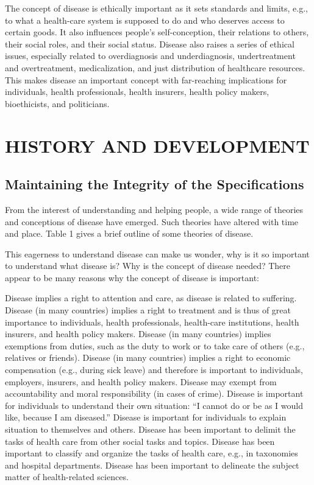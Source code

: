 \documentclass[conference]{IEEEtran}
\begin{document}
The concept of disease is ethically important as it sets standards and limits, e.g., to what a health-care system is supposed to do and who deserves access to certain goods. It also inﬂuences people’s self-conception, their relations to others, their social roles, and their social status. Disease also raises a series of ethical issues, especially related to overdiagnosis and underdiagnosis, undertreatment and overtreatment, medicalization, and just distribution of healthcare resources. This makes disease an important concept with far-reaching implications for individuals, health professionals, health insurers, health policy makers, bioethicists, and politicians.
\section{HISTORY AND DEVELOPMENT}

\subsection{Maintaining the Integrity of the Specifications}
\cite{b1}
From the interest of understanding and helping people, a wide range of theories and conceptions of disease have emerged. Such theories have altered with time and place. Table 1 gives a brief outline of some theories of disease.

This eagerness to understand disease can make us wonder, why is it so important to understand what disease is? Why is the concept of disease needed? There appear to be many reasons why the concept of disease is important:

Disease implies a right to attention and care, as disease is related to suffering.
Disease (in many countries) implies a right to treatment and is thus of great importance to individuals, health professionals, health-care institutions, health insurers, and health policy makers.
Disease (in many countries) implies exemptions from duties, such as the duty to work or to take care of others (e.g., relatives or friends).
Disease (in many countries) implies a right to economic compensation (e.g., during sick leave) and therefore is important to individuals, employers, insurers, and health policy makers.
Disease may exempt from accountability and moral responsibility (in cases of crime).
Disease is important for individuals to understand their own situation: “I cannot do or be as I would like, because I am diseased.”
Disease is important for individuals to explain  situation to themselves and others.
Disease has been important to delimit the tasks of health care from other social tasks and topics.
Disease has been important to classify and organize the tasks of health care, e.g., in taxonomies and hospital departments.
Disease has been important to delineate the subject matter of health-related sciences.
\end{document}
